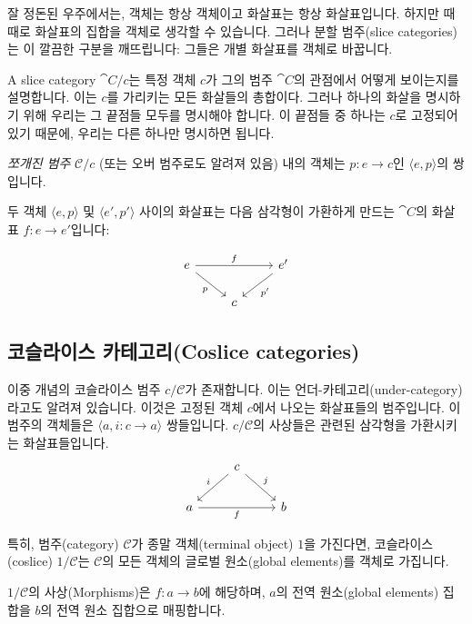 \documentclass[DaoFP]{subfiles}
\begin{document}
잘 정돈된 우주에서는, 객체는 항상 객체이고 화살표는 항상 화살표입니다. 
하지만 때때로 화살표의 집합을 객체로 생각할 수 있습니다. 
그러나 분할 범주(slice categories)는 이 깔끔한 구분을 깨뜨립니다: 
그들은 개별 화살표를 객체로 바꿉니다.

A slice category $\cat C/c$는 특정 객체 $c$가 그의 범주 $\cat C$의 관점에서 어떻게 보이는지를 설명합니다. 이는 $c$를 가리키는 모든 화살들의 총합이다. 그러나 하나의 화살을 명시하기 위해 우리는 그 끝점들 모두를 명시해야 합니다. 이 끝점들 중 하나는 $c$로 고정되어 있기 때문에, 우리는 다른 하나만 명시하면 됩니다.

\emph{쪼개진 범주} $\mathcal{C}/c$ (또는 오버 범주로도 알려져 있음) 내의 객체는 $p \colon e \to c$인 $\langle e, p \rangle$의 쌍입니다.

두 객체 $\langle e, p \rangle$ 및 $\langle e', p' \rangle$ 사이의 화살표는 다음 삼각형이 가환하게 만드는 $\cat C$의 화살표 $f \colon e \to e'$입니다:

\[
 \begin{tikzcd}
 e
 \arrow[rd, "p"']
 \arrow[rr, "f"]
 && e'
 \arrow[ld, "p'"]
 \\
 &c
  \end{tikzcd}
\]

\subsection{코슬라이스 카테고리(Coslice categories)}

이중 개념의 코슬라이스 범주 $c / \mathcal{C}$가 존재합니다. 이는 언더-카테고리(under-category)라고도 알려져 있습니다. 이것은 고정된 객체 $c$에서 나오는 화살표들의 범주입니다. 이 범주의 객체들은 $\langle a, i \colon c \to a \rangle$ 쌍들입니다. $c / \mathcal{C}$의 사상들은 관련된 삼각형을 가환시키는 화살표들입니다.
\[
 \begin{tikzcd}
& c
 \arrow[rd, "j"]
 \arrow[ld, "i"']
 \\
a
\arrow[rr, "f"']
&& b
  \end{tikzcd}
\]

특히, 범주(category) $\mathcal{C}$가 종말 객체(terminal object) $1$을 가진다면, 코슬라이스(coslice) $1 / \mathcal{C}$는 $\mathcal{C}$의 모든 객체의 글로벌 원소(global elements)를 객체로 가집니다.


$1/\mathcal{C}$의 사상(Morphisms)은 $f \colon a \to b$에 해당하며, $a$의 전역 원소(global elements) 집합을 $b$의 전역 원소 집합으로 매핑합니다.
\end{document}
